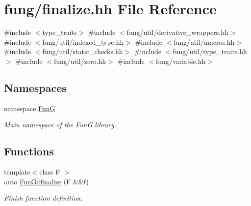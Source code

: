 \hypertarget{finalize_8hh}{\section{fung/finalize.hh \-File \-Reference}
\label{finalize_8hh}
}
{\ttfamily \#include $<$type\-\_\-traits$>$}\*
{\ttfamily \#include $<$fung/util/derivative\-\_\-wrappers.\-hh$>$}\*
{\ttfamily \#include $<$fung/util/indexed\-\_\-type.\-hh$>$}\*
{\ttfamily \#include $<$fung/util/macros.\-hh$>$}\*
{\ttfamily \#include $<$fung/util/static\-\_\-checks.\-hh$>$}\*
{\ttfamily \#include $<$fung/util/type\-\_\-traits.\-hh$>$}\*
{\ttfamily \#include $<$fung/util/zero.\-hh$>$}\*
{\ttfamily \#include $<$fung/variable.\-hh$>$}\*
\subsection*{\-Namespaces}
\begin{DoxyCompactItemize}
\item 
namespace \hyperlink{namespaceFunG}{\-Fun\-G}
\begin{DoxyCompactList}\small\item\em \-Main namespace of the \-Fun\-G library. \end{DoxyCompactList}\end{DoxyCompactItemize}
\subsection*{\-Functions}
\begin{DoxyCompactItemize}
\item 
{\footnotesize template$<$class F $>$ }\\auto \hyperlink{namespaceFunG_ac59f2ececc3cd451860776320a4a93d5}{\-Fun\-G\-::finalize} (\-F \&\&f)
\begin{DoxyCompactList}\small\item\em \-Finish function definition. \end{DoxyCompactList}\end{DoxyCompactItemize}
